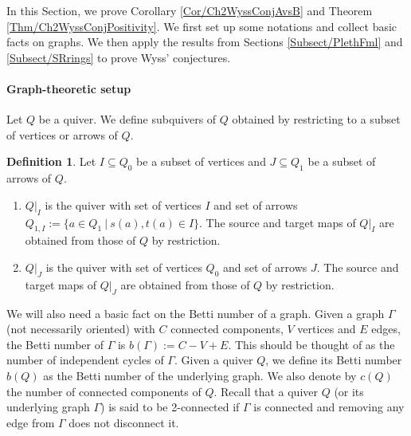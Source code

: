 \documentclass[11pt,english]{article}
\numberwithin{equation}{section}
\numberwithin{figure}{section}
\theoremstyle{definition}
\newtheorem{df}{Definition}[subsection]
\theoremstyle{plain}
\theoremstyle{remark}
\begin{document}
In this Section, we prove Corollary \ref{Cor/Ch2WyssConjAvsB} and
Theorem \ref{Thm/Ch2WyssConjPositivity}. We first set up some notations
and collect basic facts on graphs. We then apply the results from
Sections \ref{Subsect/PlethFml} and \ref{Subsect/SRrings} to prove
Wyss' conjectures.

\paragraph*{Graph-theoretic setup}

Let $Q$ be a quiver. We define subquivers of $Q$ obtained by restricting
to a subset of vertices or arrows of $Q$.

\begin{df}

Let $I\subseteq Q_{0}$ be a subset of vertices and $J\subseteq Q_{1}$
be a subset of arrows of $Q$.
\begin{enumerate}
\item $Q\vert_{I}$ is the quiver with set of vertices $I$ and set of arrows
$Q_{1,I}:=\{a\in Q_{1}\ \vert\ s(a),t(a)\in I\}$. The source and
target maps of $Q\vert_{I}$ are obtained from those of $Q$ by restriction.
\item $Q\vert_{J}$ is the quiver with set of vertices $Q_{0}$ and set
of arrows $J$. The source and target maps of $Q\vert_{J}$ are obtained
from those of $Q$ by restriction.
\end{enumerate}
\end{df}

We will also need a basic fact on the Betti number of a graph. Given
a graph $\Gamma$ (not necessarily oriented) with $C$ connected components,
$V$ vertices and $E$ edges, the Betti number of $\Gamma$ is $b(\Gamma):=C-V+E$.
This should be thought of as the number of independent cycles of $\Gamma$.
Given a quiver $Q$, we define its Betti number $b(Q)$ as the Betti
number of the underlying graph. We also denote by $c(Q)$ the number
of connected components of $Q$. Recall that a quiver $Q$ (or its
underlying graph $\Gamma$) is said to be 2-connected if $\Gamma$
is connected and removing any edge from $\Gamma$ does not disconnect
it. 
\end{document}
